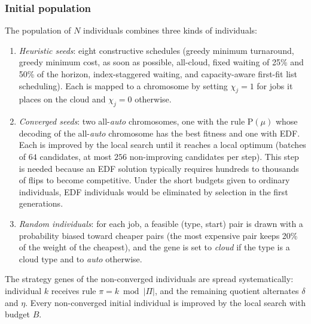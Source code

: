 \documentclass[conference]{IEEEtran}
\begin{document}
\subsubsection{Initial population}
The population of $N$ individuals combines three kinds of individuals:
\begin{enumerate}
 \item \emph{Heuristic seeds}: eight constructive schedules (greedy minimum turnaround, greedy minimum cost, as soon as possible, all-cloud, fixed waiting of 25\% and 50\% of the horizon, index-staggered waiting, and capacity-aware first-fit list scheduling). Each is mapped to a chromosome by setting $\chi_j=1$ for jobs it places on the cloud and $\chi_j=0$ otherwise.
 \item \emph{Converged seeds}: two all-\emph{auto} chromosomes, one with the rule $\mathrm{P}(\mu)$ whose decoding of the all-\emph{auto} chromosome has the best fitness and one with EDF. Each is improved by the local search until it reaches a local optimum (batches of $64$ candidates, at most $256$ non-improving candidates per step). This step is needed because an EDF solution typically requires hundreds to thousands of flips to become competitive. Under the short budgets given to ordinary individuals, EDF individuals would be eliminated by selection in the first generations.
 \item \emph{Random individuals}: for each job, a feasible (type, start) pair is drawn with a probability biased toward cheaper pairs (the most expensive pair keeps 20\% of the weight of the cheapest), and the gene is set to \emph{cloud} if the type is a cloud type and to \emph{auto} otherwise.
\end{enumerate}
The strategy genes of the non-converged individuals are spread systematically: individual $k$ receives rule $\pi=k\bmod|\Pi|$, and the remaining quotient alternates $\delta$ and $\eta$. Every non-converged initial individual is improved by the local search with budget $B$.
\end{document}
